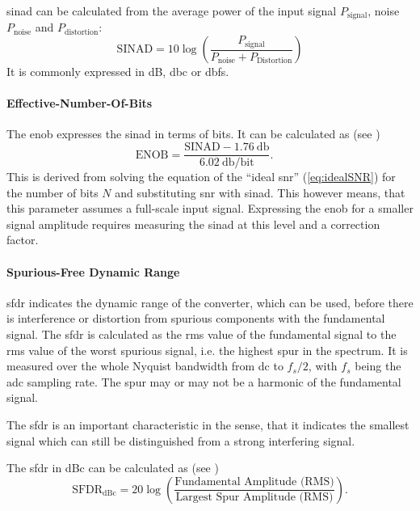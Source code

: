 \gls{sinad} can be calculated from the average power of the input signal $P_\text{signal}$, noise $P_\text{noise}$ and $P_\text{distortion}$:
\begin{equation}
	\text{SINAD} = 10 \log \left( \frac{P_\text{signal}}{P_\text{noise} + P_\text{Distortion}} \right)
\end{equation}
It is commonly expressed in dB, \gls{dbc} or \gls{dbfs}.

\paragraph{Effective-Number-Of-Bits}
The \gls{enob} expresses the \gls{sinad} in terms of bits. It can be calculated as (see \cite{walt2009})
\begin{equation}
	\text{ENOB} = \frac{\text{SINAD}-\SI{1.76}{\decibel}}{\SI{6.02}{\decibel}/\text{bit}}. \quad 
\end{equation}
This is derived from solving the equation of the ``ideal \gls{snr}'' (\autoref{eq:idealSNR}) for the number of bits $N$ and substituting \gls{snr} with \gls{sinad}.
This however means, that this parameter assumes a full-scale input signal. Expressing the \gls{enob} for a smaller signal amplitude requires measuring the \gls{sinad} at this level and a correction factor. \cite{walt}

\paragraph{Spurious-Free Dynamic Range}
\gls{sfdr} indicates the dynamic range of the converter, which can be used, before there is interference or distortion from spurious components with the fundamental signal. \cite{Lundberg} 
The \gls{sfdr} is calculated as the \gls{rms} value of the fundamental signal to the \gls{rms} value of the worst spurious signal, i.e. the highest spur in the spectrum.
It is measured over the whole Nyquist bandwidth from \gls{dc} to $f_s/2$, with $f_s$ being the \gls{adc} sampling rate. The spur may or may not be a harmonic of the fundamental signal. \cite{walt2009, Lundberg}

The \gls{sfdr} is an important characteristic in the sense, that it indicates the smallest signal which can still be distinguished from a strong interfering signal. \cite{walt2009} 

The \gls{sfdr} in dBc can be calculated as (see \cite{xilinx_adc})%
\begin{equation}
	\text{SFDR}_\text{dBc} = 20 \log \left( \frac{\text{Fundamental Amplitude (RMS)}}{\text{Largest Spur Amplitude (RMS)}} \right).
\end{equation}


